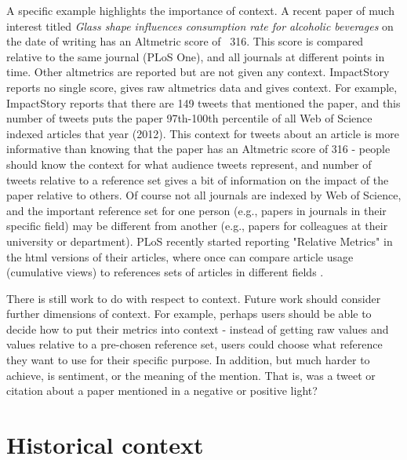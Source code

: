 \documentclass[letterpaper,superscriptaddress,showkeys,longbibliography]{revtex4-1}\usepackage{graphicx, color}
\begin{document}
A specific example highlights the importance of context. A recent paper of much interest titled \emph{Glass shape influences consumption rate for alcoholic beverages} \cite{attwood2012} on the date of writing has an Altmetric score of ~316. This score is compared relative to the same journal (PLoS One), and all journals at different points in time. Other altmetrics are reported but are not given any context. ImpactStory reports no single score, gives raw altmetrics data and gives context. For example, ImpactStory reports that there are 149 tweets that mentioned the paper, and this number of tweets puts the paper 97th-100th percentile of all Web of Science indexed articles that year (2012). This context for tweets about an article is more informative than knowing that the paper has an Altmetric score of 316 - people should know the context for what audience tweets represent, and number of tweets relative to a reference set gives a bit of information on the impact of the paper relative to others. Of course not all journals are indexed by Web of Science, and the important reference set for one person (e.g., papers in journals in their specific field) may be different from another (e.g., papers for colleagues at their university or department). PLoS recently started reporting "Relative Metrics" in the html versions of their articles, where once can compare article usage (cumulative views) to references sets of articles in different fields \cite{allen2013}.

There is still work to do with respect to context. Future work should consider further dimensions of context. For example, perhaps users should be able to decide how to put their metrics into context - instead of getting raw values and values relative to a pre-chosen reference set, users could choose what reference they want to use for their specific purpose. In addition, but much harder to achieve, is sentiment, or the meaning of the mention. That is, was a tweet or citation about a paper mentioned in a negative or positive light?

\section*{Historical context}
\end{document}

